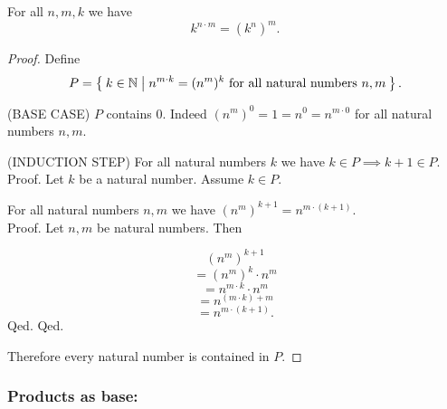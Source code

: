 \documentclass[../../arithmetic.ftl.tex]{subfiles}
\begin{document}
  \begin{forthel}
    \begin{proposition}\label{Arithmetic_01_04_531499}
      For all $n,m,k$ we have \[ k^{n \cdot m} = (k^{n})^{m}. \]
    \end{proposition}
    \begin{proof}
      Define \[ P = \Set{k \in \mathbb{N} | \text{$n^{m \cdot k} = (n^{m})^{k}$ for all natural numbers $n,m$}}. \]

      (BASE CASE) $P$ contains $0$.
      Indeed $(n^{m})^{0} = 1 = n^{0} = n^{m \cdot 0}$ for all natural numbers $n,m$.

      (INDUCTION STEP) For all natural numbers $k$ we have $k \in P \implies k + 1 \in P$. \\
      Proof.
        Let $k$ be a natural number.
        Assume $k \in P$.

        For all natural numbers $n,m$ we have $(n^{m})^{k + 1} =
        n^{m \cdot (k + 1)}$. \\
        Proof.
          Let $n,m$ be natural numbers.
          Then

          \[   (n^{m})^{k + 1} \]
          \[ = (n^{m})^{k} \cdot n^{m} \]   %
          \[ = n^{m \cdot k} \cdot n^{m} \] %
          \[ = n^{(m \cdot k) + m} \]       %
          \[ = n^{m \cdot (k + 1)}. \]      %
        Qed.
      Qed.

      Therefore every natural number is contained in $P$.
    \end{proof}
  \end{forthel}


  \subsubsection*{Products as base:}
\end{document}
